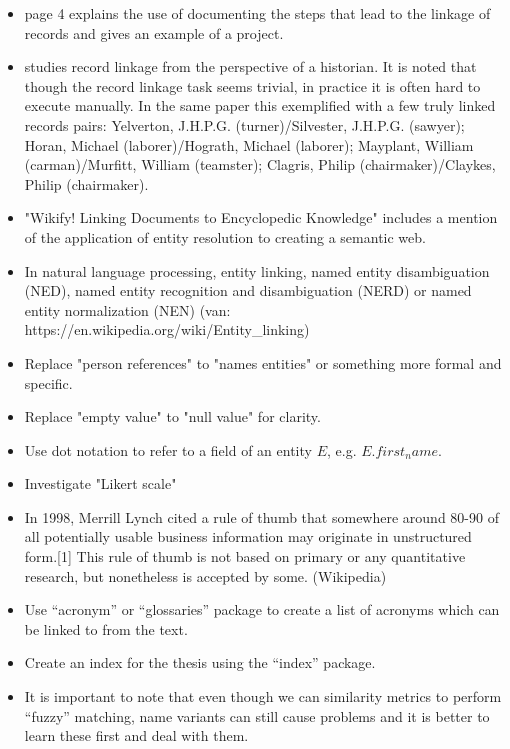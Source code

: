 \documentclass{article}
\begin{document}
\begin{itemize}
    \item \cite{Winchester1970} page 4 explains the use of documenting the steps that lead to the linkage of records and gives an example of a project.
    \item \cite{Winchester1970} studies record linkage from the perspective of a historian. It is noted that though the record linkage task seems trivial, in practice it is often hard to execute manually. In the same paper this exemplified with a few truly linked records pairs: Yelverton, J.H.P.G. (turner)/Silvester, J.H.P.G. (sawyer); Horan, Michael (laborer)/Hograth, Michael (laborer); Mayplant, William (carman)/Murfitt, William (teamster); Clagris, Philip (chairmaker)/Claykes, Philip (chairmaker).
    \item "Wikify! Linking Documents to Encyclopedic Knowledge" includes a mention of the application of entity resolution to creating a semantic web.
    \item In natural language processing, entity linking, named entity disambiguation (NED), named entity recognition and disambiguation (NERD) or named entity normalization (NEN) (van: https://en.wikipedia.org/wiki/Entity_linking)
    \item Replace "person references" to "names entities" or something more formal and specific.
    \item Replace "empty value" to "null value" for clarity.
    \item Use dot notation to refer to a field of an entity $E$, e.g. $E.first_name$.
    \item Investigate "Likert scale"
    \item In 1998, Merrill Lynch cited a rule of thumb that somewhere around 80-90 of all potentially usable business information may originate in unstructured form.[1] This rule of thumb is not based on primary or any quantitative research, but nonetheless is accepted by some. (Wikipedia)
    \item Use ``acronym'' or ``glossaries'' package to create a list of acronyms which can be linked to from the text.
    \item Create an index for the thesis using the ``index'' package.
    \item It is important to note that even though we can similarity metrics to perform ``fuzzy'' matching, name variants can still cause problems and it is better to learn these first and deal with them.
\end{itemize}



\end{document}
